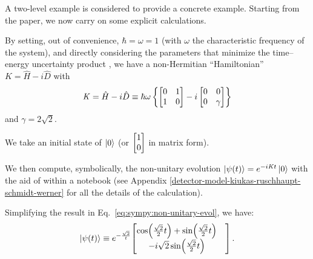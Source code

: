 A two-level example is considered to provide a concrete example.
Starting from the paper, we now carry on some explicit calculations.

By setting, out of convenience, $\hbar = \omega = 1$
(with $\omega$ the characteristic frequency of the system),
and directly considering the parameters
that minimize the time--energy uncertainty product \parencite{RuschhauptAbsorption},
we have a non-Hermitian ``Hamiltonian''
$\mathit{K} = \hat{H} - i\hat{D}$ with
\begin{equation}\label{eq:complexpot}
  \mathit{K} = \hat{H} - i\hat{D} \underset{}{\equiv}
    \hbar\omega\left\{
      \left[\begin{matrix}0 & 1\\1 & 0\end{matrix}\right] -
      i \left[\begin{matrix}0 & 0\\0 & \gamma \end{matrix}\right]
    \right\}
\end{equation}
and $\gamma = 2\sqrt{2}$.

We take an initial state of $\ket{0}$
(or $\mqty[1\\0]$ in matrix form).

We then compute, symbolically, the non-unitary evolution
$\ket{\psi(t)} = e^{-i\mathit{K}t}\ket{0}$
with the aid of  \parencite{comp:sympy} within a  \parencite{comp:jupyter} notebook
(see Appendix \ref{detector-model-kiukas-ruschhaupt-schmidt-werner} for all the details of the calculation).

Simplifying the result in Eq.~\eqref{eq:sympy:non-unitary-evol}, we have:
\begin{equation}
  \ket{\psi(t)} \repr e^{-\frac{\sqrt{2}}{t}} \mqty[
    \cos(\frac{\sqrt{2}}{2}t) + \sin(\frac{\sqrt{2}}{2}t)& \\
                     -i\sqrt{2} \sin(\frac{\sqrt{2}}{2}t)&
  ] \,\text{.}
\end{equation}

